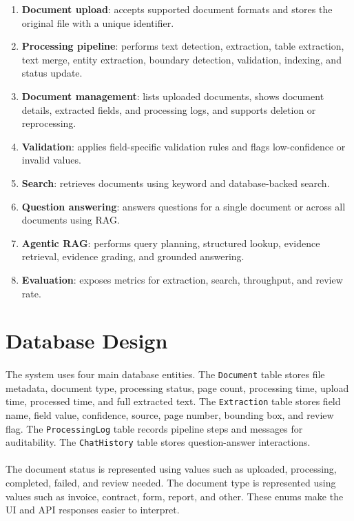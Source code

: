 \begin{enumerate}
    \item \textbf{Document upload}: accepts supported document formats and stores the original file with a unique identifier.
    \item \textbf{Processing pipeline}: performs text detection, extraction, table extraction, text merge, entity extraction, boundary detection, validation, indexing, and status update.
    \item \textbf{Document management}: lists uploaded documents, shows document details, extracted fields, and processing logs, and supports deletion or reprocessing.
    \item \textbf{Validation}: applies field-specific validation rules and flags low-confidence or invalid values.
    \item \textbf{Search}: retrieves documents using keyword and database-backed search.
    \item \textbf{Question answering}: answers questions for a single document or across all documents using RAG.
    \item \textbf{Agentic RAG}: performs query planning, structured lookup, evidence retrieval, evidence grading, and grounded answering.
    \item \textbf{Evaluation}: exposes metrics for extraction, search, throughput, and review rate.
\end{enumerate}

\section{Database Design}
\paragraph{} The system uses four main database entities. The \texttt{Document} table stores file metadata, document type, processing status, page count, processing time, upload time, processed time, and full extracted text. The \texttt{Extraction} table stores field name, field value, confidence, source, page number, bounding box, and review flag. The \texttt{ProcessingLog} table records pipeline steps and messages for auditability. The \texttt{ChatHistory} table stores question-answer interactions.

\paragraph{} The document status is represented using values such as uploaded, processing, completed, failed, and review needed. The document type is represented using values such as invoice, contract, form, report, and other. These enums make the UI and API responses easier to interpret.

